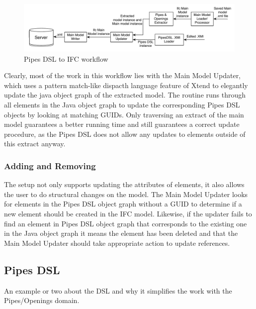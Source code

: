 \begin{figure}[htbp]
    \centering
        \includegraphics[width=120mm]{images/Pipes2IFC.pdf}
    \caption{Pipes DSL to IFC workflow}
    \label{fig:Pipes2IFCWorkflow}
\end{figure}

Clearly, most of the work in this workflow lies with the Main Model Updater, which uses a pattern match-like dispacth language feature of Xtend to elegantly update the java object graph of the extracted model. The routine runs through all elements in the Java object graph to update the corresponding Pipes DSL objects by looking at matching GUIDs. Only traversing an extract of the main model guarantees a better running time and still guarantees a correct update procedure, as the Pipes DSL does not allow any updates to elements outside of this extract anyway.
\subsubsection{Adding and Removing}
The setup not only supports updating the attributes of elements, it also allows the user to do structural changes on the model. The Main Model Updater looks for elements in the Pipes DSL object graph without a GUID to determine if a new element should be created in the IFC model. Likewise, if the updater fails to find an element in Pipes DSL object graph that corresponds to the existing one in the Java object graph it means the element has been deleted and that the Main Model Updater should take appropriate action to update references.

\subsection{Pipes DSL}
An example or two about the DSL and why it simplifies the work with the Pipes/Openings domain.













